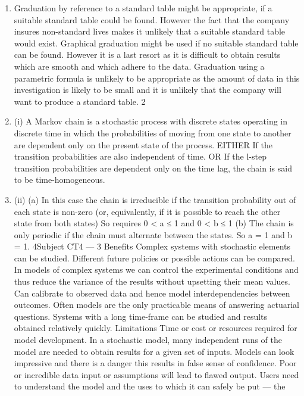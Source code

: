 \documentclass[a4paper,12pt]{article}
\begin{document}
\begin{enumerate}

\item %
Graduation by reference to a standard table might be appropriate, if a suitable
standard table could be found.
However the fact that the company insures non-standard lives makes it unlikely that a
suitable standard table would exist.
Graphical graduation might be used if no suitable standard table can be found.
However it is a last resort as it is difficult to obtain results which are smooth and
which adhere to the data.
Graduation using a parametric formula is unlikely to be appropriate as the amount of
data in this investigation is likely to be small and it is unlikely that the company will
want to produce a standard table.
2
\item (i)
A Markov chain is a stochastic process with discrete states operating in
discrete time in which the probabilities of moving from one state to another
are dependent only on the present state of the process.
EITHER
If the transition probabilities are also independent of time.
OR
If the l-step transition probabilities are dependent only on the time lag, the
chain is said to be time-homogeneous.
\item (ii)
(a)
In this case the chain is irreducible if the transition probability
out of each state is non-zero (or, equivalently, if it is possible to
reach the other state from both states)
So requires 0 < a ≤ 1 and 0 < b ≤ 1
(b)
The chain is only periodic if the chain must alternate between
the states.
So a = 1 and b = 1.
4Subject CT4 — %
3
Benefits
Complex systems with stochastic elements can be studied.
Different future policies or possible actions can be compared.
In models of complex systems we can control the experimental conditions and thus
reduce the variance of the results without upsetting their mean values.
Can calibrate to observed data and hence model interdependencies between
outcomes.
Often models are the only practicable means of answering actuarial questions.
Systems with a long time-frame can be studied and results obtained relatively quickly.
Limitations
Time or cost or resources required for model development.
In a stochastic model, many independent runs of the model are needed to obtain
results for a given set of inputs.
Models can look impressive and there is a danger this results in false sense of
confidence.
Poor or incredible data input or assumptions will lead to flawed output.
Users need to understand the model and the uses to which it can safely be put — the

\end{enumerate}
\end{document}
